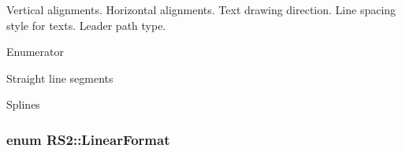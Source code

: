 Vertical alignments. Horizontal alignments. Text drawing direction. Line spacing style for texts. Leader path type. \begin{Desc}
\item[Enumerator]\par
\begin{description}
\item[{\em 
\hypertarget{classRS2_a1ca12b62d43b9a86d84ddd2e6af87967a1d30a76038f24c427bc6ff6182f7c1c5}{Straight}\label{classRS2_a1ca12b62d43b9a86d84ddd2e6af87967a1d30a76038f24c427bc6ff6182f7c1c5}
}]Straight line segments \item[{\em 
\hypertarget{classRS2_a1ca12b62d43b9a86d84ddd2e6af87967a1263220f1aba24a1c6b7423c404c6da2}{Spline}\label{classRS2_a1ca12b62d43b9a86d84ddd2e6af87967a1263220f1aba24a1c6b7423c404c6da2}
}]Splines \end{description}
\end{Desc}
\hypertarget{classRS2_a0fa0506f1e870c169e8d8c1d58d3fa6e}{
\subsubsection[{Linear\-Format}]{\setlength{\rightskip}{0pt plus 5cm}enum {\bf R\-S2\-::\-Linear\-Format}}}\label{classRS2_a0fa0506f1e870c169e8d8c1d58d3fa6e}
